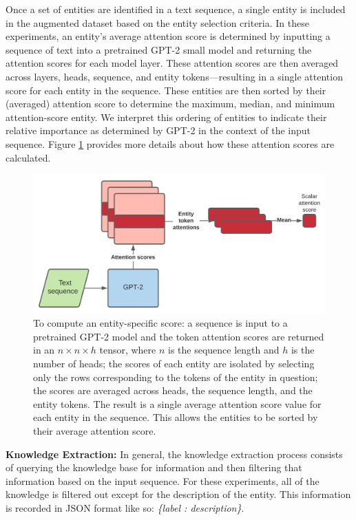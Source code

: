 \documentclass[phd,electronic,oneside,twosidetoc,letterpaper,chaptercenter,parttop,lof]{byumsphd}
\begin{document}
Once a set of entities are identified in a text sequence, a single entity is included in the augmented dataset based on the entity selection criteria. 
In these experiments, an entity's average attention score is determined by inputting a sequence of text into a pretrained GPT-2 small model and returning the attention scores for each model layer.
These attention scores are then averaged across layers, heads, sequence, and entity tokens---resulting in a single attention score for each entity in the sequence.
These entities are then sorted by their (averaged) attention score to determine the maximum, median, and minimum attention-score entity.
We interpret this ordering of entities to indicate their relative importance as determined by GPT-2 in the context of the input sequence.
Figure \ref{fig:attention_scores} provides more details about how these attention scores are calculated.

\begin{figure}
    \includegraphics[width=0.75\columnwidth]{images/ssm/attention_score_calculation.png}
    \centering
    \caption[Attention score calculation]{
        To compute an entity-specific score: a sequence is input to a pretrained GPT-2 model and the token attention scores are returned in an 
        $n\times n\times h$
        tensor, where $n$ is the sequence length and $h$ is the number of heads;   
        the scores of each entity are isolated by selecting only the rows corresponding to the tokens of the entity in question; the scores are averaged across heads, the sequence length, and the entity tokens.
        The result is a single average attention score value for each entity in the sequence. 
        This allows the entities to be sorted by their average attention score.
    }
    \label{fig:attention_scores}
\end{figure}

\textbf{Knowledge Extraction:}
In general, the knowledge extraction process consists of querying the knowledge base for information and then filtering that information based on the input sequence. 
For these experiments, all of the knowledge is filtered out except for the description of the entity. 
This information is recorded in JSON format like so: \emph{\{label : description\}}.
\end{document}

